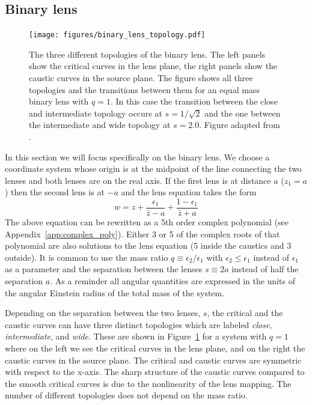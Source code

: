 \documentclass[12pt,dvipsnames]{report}
\begin{document}
\subsection{Binary lens}
\begin{figure}[ht!]
    \centering
    \texttt{[image: figures/binary\_lens\_topology.pdf]}
    \caption{The three different topologies of the binary lens. The left panels show the
        critical curves in the lens plane, the right panels show the caustic curves in the
        source plane. The figure shows all three topologies and the transitions between
        them for an equal mass binary lens with $q=1$. In this case the transition between
        the close and intermediate topology occurs at $s=1/\sqrt{2}$ and the one between
        the intermediate and wide topology at $s=2.0$. Figure adapted from
        \citet{dominik1999}.
    }
    \label{fig:binary_lens_topology}
\end{figure}
In this section we will focus specifically on the binary lens. We choose a
coordinate system whose origin is at the midpoint of the line connecting the
two lenses and both lenses are on the real axis. If the first lens is at
distance $a$ ($z_1=a$) then the second lens is at $-a$ and the lens equation
takes the form
\begin{equation}
    w=z+\frac{\epsilon_{1}}{\bar{z} - a}+\frac{1 - \epsilon_{1}}{\bar{z} + a}
\end{equation}
The above equation can be rewritten as a 5th order complex polynomial
(see Appendix~\ref{app:complex_poly}). Either 3 or 5 of the complex roots of that
polynomial are also solutions to the lens equation
(5 inside the caustics and 3 outside).
It is common to use the mass ratio $q\equiv \epsilon_2/\epsilon_1$ with
$\epsilon_2 \leq \epsilon_1$ instead  of $\epsilon_1$ as a parameter and the
separation between the lenses $s\equiv 2a$ instead of half the separation $a$.
As a reminder all angular quantities are expressed in the units of the angular Einstein
radius of the total mass of the system.

Depending on the separation between the two lenses, $s$, the critical and the
caustic curves can have three distinct topologies which are labeled
\emph{close}, \emph{intermediate}, and \emph{wide}. These are shown in
Figure~\ref{fig:binary_lens_topology} for a system with $q=1$ where on the left
we see the critical curves in the lens plane, and on the right the caustic
curves in the source plane. The critical and caustic curves are symmetric with
respect to the x-axis. The sharp structure of the caustic curves compared to
the smooth critical curves is due to the nonlinearity of the lens mapping. The
number of different topologies does not depend on the mass ratio.
\end{document}
